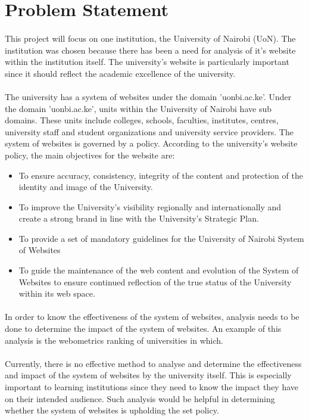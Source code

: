 \section{Problem Statement}
\paragraph{}
This project will focus on one institution, the University of Nairobi (UoN). The institution was chosen because there has been a need for analysis of it's website within the institution itself. The university's website is particularly important since it should reflect the academic excellence of the university.
\paragraph{}
The university has a system of websites under the domain 'uonbi.ac.ke'. Under the domain 'uonbi.ac.ke', units within the  University of Nairobi have sub domains. These units include colleges, schools, faculties, institutes, centres, university staff and student organizations and university service providers. The system of websites is governed by a policy. According to the university's website policy, the main objectives for the website are:
\begin{itemize}
\item To ensure accuracy, consistency, integrity of the content and protection of the identity and image of the University.
\item To improve the University's visibility regionally and internationally and create a strong brand in line with the University's Strategic Plan.
\item To provide a set of mandatory guidelines for the University of Nairobi System of Websites
\item To guide the maintenance of the web content and evolution of the System of Websites to ensure continued reflection of the true status of the University within its web space.
\end{itemize}
\paragraph{}
In order to know the effectiveness of the system of websites, analysis needs to be done to determine the impact of the system of websites. An example of this analysis is the webometrics ranking of universities in which.
\paragraph{}
Currently, there is no effective method to analyse and determine the effectiveness and impact of the system of websites by the university itself. This is especially important to learning institutions since they need to know the impact they have on their intended audience.  Such analysis would be helpful in determining whether the system of websites is upholding the set policy.



